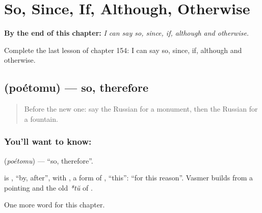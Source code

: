 
\chapter{So, Since, If, Although, Otherwise}
\label{ch:ru-so-since-if-although-otherwise}

\begin{chapteropening}
\textbf{By the end of this chapter:} \emph{I can say so, since, if, although and otherwise.}

Complete the last lesson of chapter 154: I can say so, since, if, although and otherwise.
\end{chapteropening}

\section[\texorpdfstring{\ru{поэтому} (poétomu)}{поэтому (poétomu)}]{ (poétomu) — so, therefore}

\label{lesson:RU-C154-poetomu}



\begin{quote}
Before the new one: say the Russian for a monument, then the Russian for a fountain.
\end{quote}

\subsection*{You'll want to know: }
\textbf{} (\emph{poétomu}) — \textquotedblleft{}so, therefore\textquotedblright{}.

\begin{cousinweb}
\textbf{} is \emph{}, \textquotedblleft{}by, after\textquotedblright{}, with \emph{}, a form of \emph{}, \textquotedblleft{}this\textquotedblright{}: \textquotedblleft{}for this reason\textquotedblright{}. Vasmer builds \emph{} from a pointing \emph{} and the old \emph{*tŭ} of \emph{}.
\end{cousinweb}

\begin{grammarlens}[title={What you've built}]
One more word for this chapter.
\end{grammarlens}

